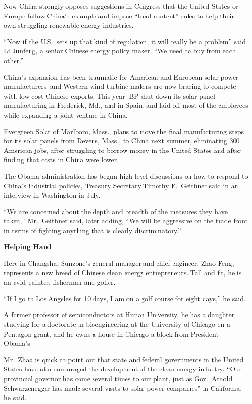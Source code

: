 ﻿\documentclass[12pt]{article}
\begin{document}
Now China strongly opposes suggestions in Congress that the United States or Europe follow China's
example and impose ``local content'' rules to help their own struggling renewable energy industries.

``Now if the U.S.~sets up that kind of regulation, it will really be a problem'' said Li Junfeng, a
senior Chinese energy policy maker. ``We need to buy from each other.''

China's expansion has been traumatic for American and European solar power manufacturers, and
Western wind turbine makers are now bracing to compete with low-cost Chinese exports. This year, BP
shut down its solar panel manufacturing in Frederick, Md., and in Spain, and laid off most of the
employees while expanding a joint venture in China.

Evergreen Solar of Marlboro, Mass., plans to move the final manufacturing steps for its solar panels
from Devens, Mass., to China next summer, eliminating 300 American jobs, after struggling to borrow
money in the United States and after finding that costs in China were lower.

The Obama administration has begun high-level discussions on how to respond to China's industrial
policies, Treasury Secretary Timothy F.~Geithner said in an interview in Washington in July.

``We are concerned about the depth and breadth of the measures they have taken,'' Mr.~Geithner said,
later adding, ``We will be aggressive on the trade front in terms of fighting anything that is
clearly discriminatory.''

\textbf{Helping Hand}

Here in Changsha, Sunzone's general manager and chief engineer, Zhao Feng, represents a new breed of
Chinese clean energy entrepreneurs. Tall and fit, he is an avid painter, fisherman and golfer.

``If I go to Los Angeles for 10 days, I am on a golf course for eight days,'' he said.

A former professor of semiconductors at Hunan University, he has a daughter studying for a doctorate
in bioengineering at the University of Chicago on a Pentagon grant, and he owns a house in Chicago a
block from President Obama's.

Mr.~Zhao is quick to point out that state and federal governments in the United States have also
encouraged the development of the clean energy industry. ``Our provincial governor has come several
times to our plant, just as Gov.~Arnold Schwarzenegger has made several visits to solar power
companies'' in California, he said.
\end{document}
